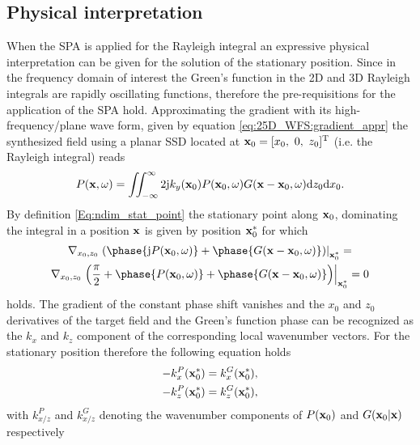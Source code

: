 \subsection{Physical interpretation}
When the SPA is applied for the Rayleigh integral an expressive physical interpretation can be given for the solution of the stationary position.
Since in the frequency domain of interest the Green's function in the 2D and 3D Rayleigh integrals are rapidly oscillating functions, therefore the pre-requisitions for the application of the SPA hold. Approximating the gradient with its high-frequency/plane wave form, given by equation \eqref{eq:25D_WFS:gradient_appr} 
the synthesized field using a planar SSD located at $\mathbf{x}_0 = [x_0,\ 0,\ z_0]^{\mathrm{T}}$ (i.e. the Rayleigh integral) reads
\begin{equation}
P(\mathbf{x},\omega) = \iint_{-\infty}^{\infty} 2 \mathrm{j} k_y(\mathbf{x}_0) P(\mathbf{x}_0,\omega) G(\mathbf{x}-\mathbf{x}_0,\omega) \mathrm{d} z_0 \mathrm{d} x_0. 
\end{equation}
By definition \eqref{Eq:ndim_stat_point} the stationary point along $\mathbf{x}_0$, dominating the integral in a position $\mathbf{x}$ is given by position $\mathbf{x}_0^*$ for which 
\begin{multline}
\nabla_{x_0,z_0} \left. \left( \phase{ \ti P(\vxo,\omega)} + \phase{ G(\vx-\vxo,\omega)} \right) \right|_{\vxo^*} =
\\
\nabla_{x_0,z_0} \left. \left( \frac{\pi}{2}+\phase{ P(\vxo,\omega)} + \phase{ G(\vx-\vxo,\omega)} \right) \right|_{\vxo^*} = 0
\end{multline}
holds. The gradient of the constant phase shift vanishes and the $x_0$ and $z_0$ derivatives of the target field and the Green's function phase can be recognized as the $k_x$ and $k_z$ component of the corresponding local wavenumber vectors. For the stationary position therefore the following equation holds
\begin{align}
\begin{split}
-k_{x}^P(\mathbf{x}_0^*) &= k_{x}^G(\mathbf{x}_0^*), \\
-k_{z}^P(\mathbf{x}_0^*) &= k_{z}^G(\mathbf{x}_0^*),
\end{split}
\end{align}
with $k_{x/z}^{P}$ and $k_{x/z}^{G}$ denoting the wavenumber components of $P(\mathbf{x}_0)$ and $G(\mathbf{x}_0|\mathbf{x})$ respectively
%
